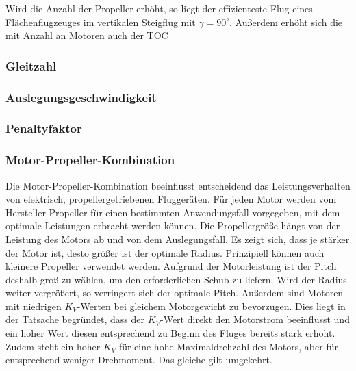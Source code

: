 Wird die Anzahl der Propeller erhöht, so liegt der effizienteste Flug eines Flächenflugzeuges im vertikalen Steigflug mit \ensuremath{\gamma = 90^\circ}. Außerdem erhöht sich die mit Anzahl an Motoren auch der TOC
\subsubsection{Gleitzahl}
\subsubsection{Auslegungsgeschwindigkeit}
\subsubsection{Penaltyfaktor}





\subsubsection{Motor-Propeller-Kombination}
Die Motor-Propeller-Kombination beeinflusst entscheidend das Leistungsverhalten von elektrisch, propellergetriebenen Fluggeräten. Für jeden Motor werden vom Hersteller Propeller für einen bestimmten Anwendungsfall vorgegeben, mit dem optimale Leistungen erbracht werden können. Die Propellergröße hängt von der Leistung des Motors ab und von dem Auslegungsfall. Es zeigt sich, dass je stärker der Motor ist, desto größer ist der optimale Radius. Prinzipiell können auch kleinere Propeller verwendet werden. Aufgrund der Motorleistung ist der Pitch deshalb groß zu wählen, um den erforderlichen Schub zu liefern. Wird der Radius weiter vergrößert, so verringert sich der optimale Pitch. Außerdem sind Motoren mit niedrigen \ensuremath{K_V}-Werten bei gleichem Motorgewicht zu bevorzugen. Dies liegt in der Tatsache begründet, dass der \ensuremath{K_V}-Wert direkt den Motorstrom beeinflusst und ein hoher Wert diesen entsprechend zu Beginn des Fluges bereits stark erhöht. Zudem steht ein hoher \ensuremath{K_V} für eine hohe Maximaldrehzahl des Motors, aber für entsprechend weniger Drehmoment. Das gleiche gilt umgekehrt. 


